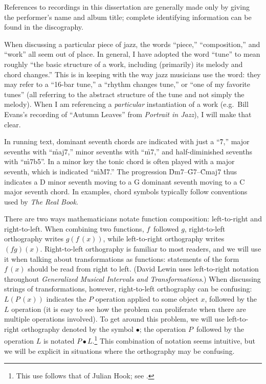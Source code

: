 \singlespacing
References to recordings in this dissertation are generally made only by
giving the performer’s name and album title; complete identifying information
can be found in the discography.

When discussing a particular piece of jazz, the words “piece,” “composition,”
and “work” all seem out of place. In general, I have adopted the word “tune”
to mean roughly “the basic structure of a work, including (primarily) its
melody and chord changes.” This is in keeping with the way jazz musicians use
the word: they may refer to a ``16-bar tune,'' a “rhythm changes tune,” or “one
of my favorite tunes” (all referring to the abstract structure of the tune and
not simply the melody). When I am referencing a \emph{particular}
instantiation of a work (e.g.~Bill Evans’s recording of “Autumn Leaves” from
\emph{Portrait in Jazz}), I will make that clear.

In running text, dominant seventh chords are indicated with just a “\h{7},”
major sevenths with “\h{maj7},” minor sevenths with “\h{m7},” and
half-diminished sevenths with “\h{m7b5}”. In a minor key the tonic chord is
often played with a major seventh, which is indicated “\h{mM7}.” The
progression \h{Dm7}--\h{G7}--\h{Cmaj7} thus indicates a D minor seventh moving
to a G dominant seventh moving to a C major seventh chord. In examples, chord
symbols typically follow conventions used by \emph{The Real Book}.

There are two ways mathematicians notate function composition: left-to-right
and right-to-left. When combining two functions, $f\,$ followed $g$,
right-to-left orthography writes $g(f\,(x))$, while left-to-right orthography
writes $(fg)(x)$. Right-to-left orthography is familiar to most readers, and
we will use it when talking about transformations as functions: statements of
the form $f\,(x)$ should be read from right to left. (David Lewin uses
left-to-right notation throughout \emph{Generalized Musical Intervals and
Transformations}.) When discussing strings of transformations, however,
right-to-left orthography can be confusing: $L(P\,(x))$ indicates the $P$
operation applied to some object $x$, followed by the $L$ operation (it is
easy to see how the problem can proliferate when there are multiple operations
involved). To get around this problem, we will use left-to-right orthography
denoted by the symbol $\bullet$; the operation $P\,$ followed by the operation
$L$ is notated $P \bullet L$.\footnote{This use follows that of Julian Hook; see
.} This combination of notation seems
intuitive, but we will be explicit in situations where the orthography may be
confusing.

\doublespacing


